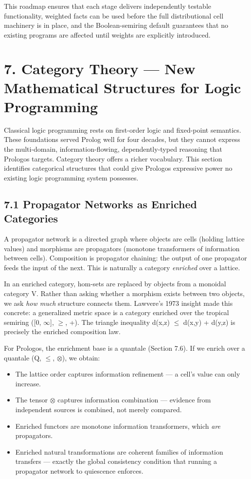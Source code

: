 \documentclass[11pt]{article}
\begin{document}
This roadmap ensures that each stage delivers independently testable functionality, weighted facts can be used before the full distributional cell machinery is in place, and the Boolean-semiring default guarantees that no existing programs are affected until weights are explicitly introduced.
\section{7. Category Theory --- New Mathematical Structures for Logic Programming}
\label{sec:org140f49b}

Classical logic programming rests on first-order logic and fixed-point semantics. These foundations served Prolog well for four decades, but they cannot express the multi-domain, information-flowing, dependently-typed reasoning that Prologos targets. Category theory offers a richer vocabulary. This section identifies categorical structures that could give Prologos expressive power no existing logic programming system possesses.
\subsection{7.1 Propagator Networks as Enriched Categories}
\label{sec:org261ba9e}

A propagator network is a directed graph where objects are cells (holding lattice values) and morphisms are propagators (monotone transformers of information between cells). Composition is propagator chaining: the output of one propagator feeds the input of the next. This is naturally a category \emph{enriched} over a lattice.

In an enriched category, hom-sets are replaced by objects from a monoidal category V. Rather than asking whether a morphism exists between two objects, we ask \emph{how much} structure connects them. Lawvere's 1973 insight made this concrete: a generalized metric space is a category enriched over the tropical semiring ([0, \(\infty\)], \(\ge\), +). The triangle inequality d(x,z) \(\le\) d(x,y) + d(y,z) is precisely the enriched composition law.

For Prologos, the enrichment base is a quantale (Section 7.6). If we enrich over a quantale (Q, \(\le\), \(\otimes\)), we obtain:

\begin{itemize}
\item The lattice order captures information refinement --- a cell's value can only increase.
\item The tensor \(\otimes\) captures information combination --- evidence from independent sources is combined, not merely compared.
\item Enriched functors are monotone information transformers, which \emph{are} propagators.
\item Enriched natural transformations are coherent families of information transfers --- exactly the global consistency condition that running a propagator network to quiescence enforces.
\end{itemize}
\end{document}
